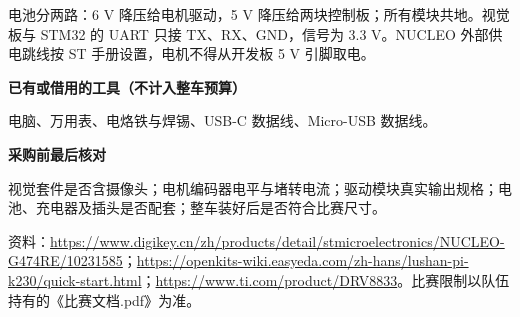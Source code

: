 \documentclass[UTF8,a4paper,10pt]{ctexart}
\begin{document}
电池分两路：6 V 降压给电机驱动，5 V 降压给两块控制板；所有模块共地。视觉板与 STM32 的 UART 只接 TX、RX、GND，信号为 3.3 V。NUCLEO 外部供电跳线按 ST 手册设置，电机不得从开发板 5 V 引脚取电。\par
\vspace{2mm}
\textbf{已有或借用的工具（不计入整车预算）}\par
电脑、万用表、电烙铁与焊锡、USB-C 数据线、Micro-USB 数据线。\par
\vspace{2mm}
\textbf{采购前最后核对}\par
视觉套件是否含摄像头；电机编码器电平与堵转电流；驱动模块真实输出规格；电池、充电器及插头是否配套；整车装好后是否符合比赛尺寸。\par
\vfill
{\footnotesize 资料：\url{https://www.digikey.cn/zh/products/detail/stmicroelectronics/NUCLEO-G474RE/10231585}；\url{https://openkits-wiki.easyeda.com/zh-hans/lushan-pi-k230/quick-start.html}；\url{https://www.ti.com/product/DRV8833}。比赛限制以队伍持有的《比赛文档.pdf》为准。}
\end{document}
